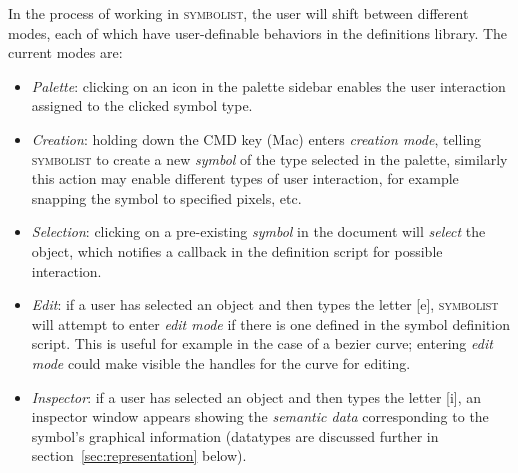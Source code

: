 \documentclass{article}
\def\symbolist{\textsc{symbolist}\xspace}
\begin{document}
In the process of working in \symbolist, the user will shift between different modes, each of which have user-definable behaviors in the definitions library.
The current modes are:
\begin{itemize}\itemsep0pt 
\item \textit{Palette}: clicking on an icon in the palette sidebar enables the user interaction assigned to the clicked symbol type.
\item \textit{Creation}: holding down the CMD key (Mac) enters \textit{creation mode}, telling \symbolist to create a new \textit{symbol} of the type selected in the palette, similarly this action may enable different types of user interaction, for example snapping the symbol to specified pixels, etc.
\item \textit{Selection}: clicking on a pre-existing \textit{symbol} in the document will \textit{select} the object, which notifies a callback in the definition script for possible interaction.
\item \textit{Edit}: if a user has selected an object and then types the letter [e], \symbolist will attempt to enter \textit{edit mode} if there is one defined in the symbol definition script. This is useful for example in the case of a bezier curve; entering \textit{edit mode} could make visible the handles for the curve for editing.
\item \textit{Inspector}: if a user has selected an object and then types the letter [i], an inspector window appears showing the \textit{semantic data} corresponding to the symbol's graphical information (datatypes are discussed further in section~\ref{sec:representation} below).
\end{itemize}
\end{document}
